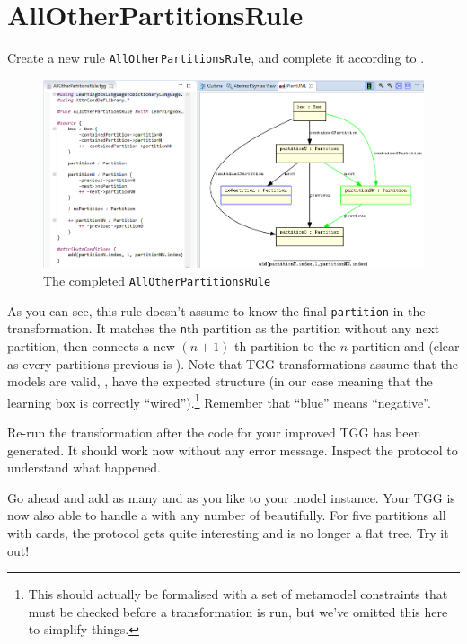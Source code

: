 \newpage
\hypertarget{allCards vis}{}
\section{AllOtherPartitionsRule}
\genHeader

\begin{stepbystep}

\item Create a new rule \texttt{AllOtherPartitionsRule}, and complete it according to .


\begin{figure}[htbp]
\begin{center}
  \includegraphics[width=\textwidth]{../../org.moflon.doc.handbook.04_tripleGraphTransformations/6_extendingTransformation/visProtoImages/ea_AllOtherPartitionsRule}
  \caption{The completed \texttt{AllOtherPartitionsRule}}
  \label{fig:ea_AllOtherPartitionsRuleComplete}
\end{center}
\end{figure}

\item As you can see, this rule doesn't assume to know the final \texttt{partition} in the transformation. 
It matches the \texttt{n}th partition as the partition without any next partition, then connects a new $(n+1)$-th partition to the $n$ partition and  (clear as every partitions previous is ).
Note that TGG transformations assume that the models are valid, \idest, have the expected structure (in our case meaning that the learning box is correctly \enquote{wired}).\footnote{This should actually be formalised with a set of metamodel constraints that must be checked before a transformation is run, but we've omitted this here to simplify things.}  
Remember that \enquote{blue} means \enquote{negative}.

\item Re-run the transformation after the code for your improved TGG has been generated. 
It should work now without any error message.
Inspect the protocol to understand what happened.

\item Go ahead and add as many  and  as you like to your model instance.
Your TGG is now also able to handle a  with any number of  beautifully.
For five partitions all with cards, the protocol gets quite interesting and is no longer a flat tree.
Try it out! 

\end{stepbystep}
